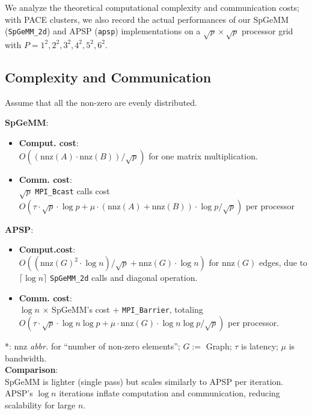 \documentclass[11pt]{article}
\begin{document}
We analyze the theoretical computational complexity and communication costs;
with PACE clusters, we also record the actual performances of our SpGeMM (\texttt{SpGeMM\_2d}) and APSP (\texttt{apsp}) implementations on a $\sqrt{p} \times \sqrt{p}$ processor grid with $P = 1^2, 2^2, 3^2, 4^2, 5^2, 6^2$.



\subsection{Complexity and Communication}
Assume that all the non-zero are evenly distributed.\\
{\color{black}
\textbf{SpGeMM}: 
\begin{itemize}[label={},itemsep=0pt,topsep=0pt] 
    \item \textbf{Comput. cost}:\\
        $O((\text{nnz}(A) \cdot \text{nnz}(B))/\sqrt{p})$ for one matrix multiplication.  
    \item \textbf{Comm. cost}:\\
        $\sqrt{p}$ \texttt{MPI\_Bcast} calls cost $O(\tau \cdot \sqrt{p} \cdot \log{p}+ \mu \cdot (\text{nnz}(A) 
        + \text{nnz}(B))\cdot \log{p}/\sqrt{p} 
        )$ per processor
\end{itemize}

\textbf{APSP}:
\begin{itemize}[label={}, itemsep=0pt,topsep=0pt]   
    \item  \textbf{Comput.cost}:\\
        $O((\text{nnz}(G)^2 \cdot \log n)/{\sqrt{p}} + \text{nnz}(G) \cdot \log n)$ for $\text{nnz}(G)$ edges, due to $\lceil \log n \rceil$ \texttt{SpGeMM\_2d} calls and diagonal operation.   
    \item  \textbf{Comm. cost}:\\ 
        $\log n$ $\times$ SpGeMM’s cost $+$ \texttt{MPI\_Barrier}, totaling 
        		$O(
        		\tau \cdot \sqrt{p} \cdot \log n \log p 
        		+ \mu \cdot \text{nnz}(G) \cdot \log n \log p / \sqrt{p})$ per processor.
\end{itemize}
}

*: 
nnz \textit{abbr.} for ``number of non-zero elements'';
$G :=$ Graph;
$\tau$ is latency; 
$\mu$ is bandwidth.
\\[1ex]

{\color{black}
\textbf{Comparison}:\\
SpGeMM is lighter (single pass) but scales similarly to APSP per iteration. 
APSP’s $\log n$ iterations inflate computation and communication, reducing scalability for large $n$.
}
\end{document}
